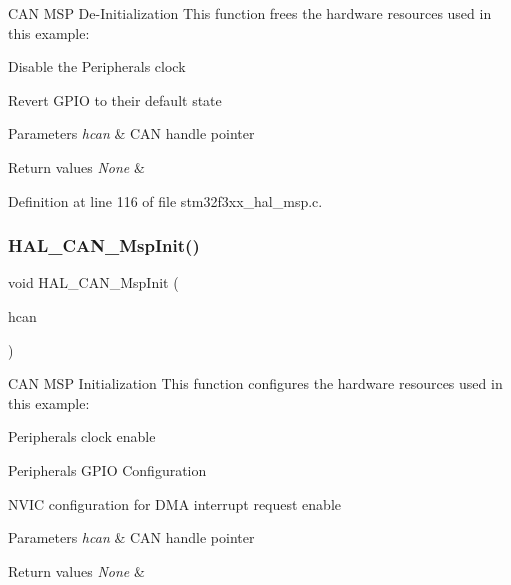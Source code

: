 C\+AN M\+SP De-\/\+Initialization This function frees the hardware resources used in this example\+: 


\begin{DoxyItemize}
\item Disable the Peripheral\textquotesingle{}s clock
\item Revert G\+P\+IO to their default state 
\begin{DoxyParams}{Parameters}
{\em hcan} & C\+AN handle pointer \\
\hline
\end{DoxyParams}

\begin{DoxyRetVals}{Return values}
{\em None} & \\
\hline
\end{DoxyRetVals}

\end{DoxyItemize}

Definition at line 116 of file stm32f3xx\+\_\+hal\+\_\+msp.\+c.

\mbox{\label{group___h_a_l___m_s_p___private___functions_ga8ecddba6a06c36b74e0b754bde266414}} 
\subsubsection{H\+A\+L\+\_\+\+C\+A\+N\+\_\+\+Msp\+Init()}
{\footnotesize\ttfamily void H\+A\+L\+\_\+\+C\+A\+N\+\_\+\+Msp\+Init (\begin{DoxyParamCaption}\item[{C\+A\+N\+\_\+\+Handle\+Type\+Def $\ast$}]{hcan }\end{DoxyParamCaption})}



C\+AN M\+SP Initialization This function configures the hardware resources used in this example\+: 


\begin{DoxyItemize}
\item Peripheral\textquotesingle{}s clock enable
\item Peripheral\textquotesingle{}s G\+P\+IO Configuration
\item N\+V\+IC configuration for D\+MA interrupt request enable 
\begin{DoxyParams}{Parameters}
{\em hcan} & C\+AN handle pointer \\
\hline
\end{DoxyParams}

\begin{DoxyRetVals}{Return values}
{\em None} & \\
\hline
\end{DoxyRetVals}

\end{DoxyItemize}

